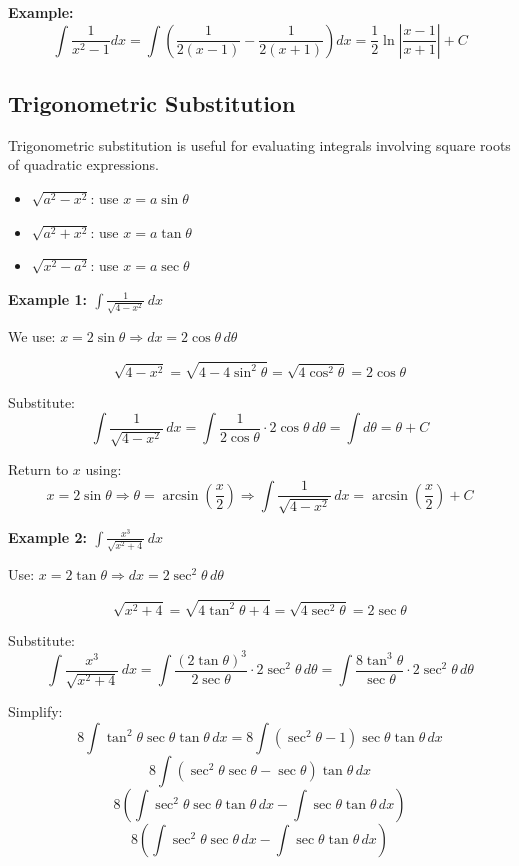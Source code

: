 \textbf{Example:}
\[
\int \frac{1}{x^2 - 1} dx = \int \left( \frac{1}{2(x - 1)} - \frac{1}{2(x + 1)} \right) dx = \frac{1}{2} \ln\left|\frac{x - 1}{x + 1}\right| + C
\]

\subsection{Trigonometric Substitution}

Trigonometric substitution is useful for evaluating integrals involving square roots of quadratic expressions.

\begin{itemize}[label=\(-\)]
    \item \(\sqrt{a^2 - x^2}\): use \(x = a \sin \theta\)
    \item \(\sqrt{a^2 + x^2}\): use \(x = a \tan \theta\)
    \item \(\sqrt{x^2 - a^2}\): use \(x = a \sec \theta\)
\end{itemize}

\textbf{Example 1: \( \int \frac{1}{\sqrt{4 - x^2}} \,dx \)}

We use: \( x = 2\sin \theta \Rightarrow dx = 2\cos \theta\, d\theta \)

\[
\sqrt{4 - x^2} = \sqrt{4 - 4\sin^2 \theta} = \sqrt{4\cos^2 \theta} = 2\cos \theta
\]

Substitute:
\[
\int \frac{1}{\sqrt{4 - x^2}} \,dx = \int \frac{1}{2\cos \theta} \cdot 2\cos \theta \,d\theta = \int d\theta = \theta + C
\]

Return to \( x \) using:
\[
x = 2\sin \theta \Rightarrow \theta = \arcsin\left(\frac{x}{2}\right)
\Rightarrow \boxed{\int \frac{1}{\sqrt{4 - x^2}} \,dx = \arcsin\left(\frac{x}{2}\right) + C}
\]


\textbf{Example 2: \( \int \frac{x^3}{\sqrt{x^2 + 4}} \,dx \)}

Use: \( x = 2\tan \theta \Rightarrow dx = 2\sec^2 \theta\, d\theta \)

\[
\sqrt{x^2 + 4} = \sqrt{4\tan^2 \theta + 4} = \sqrt{4\sec^2 \theta} = 2\sec \theta
\]

Substitute:
\[
\int \frac{x^3}{\sqrt{x^2 + 4}}\,dx = \int \frac{{(2\tan \theta)}^3}{2\sec \theta} \cdot 2\sec^2 \theta\, d\theta
= \int \frac{8\tan^3 \theta}{\sec \theta} \cdot 2\sec^2 \theta\, d\theta
\]

Simplify:
\[
8\int \tan^{2}\theta\sec\theta\tan\theta \,dx = 8\int (\sec^2\theta - 1)\sec\theta\tan\theta \,dx 
\]
\[
8\int (\sec^2\theta\sec\theta - \sec\theta)\tan\theta \,dx 
\]
\[
8\left(\int \sec^2\theta\sec\theta\tan\theta \,dx - \int\sec\theta\tan\theta \,dx \right) 
\]
\[
8\left(\int \sec^2\theta\sec\theta \,dx - \int\sec\theta\tan\theta \,dx \right) 
\]

